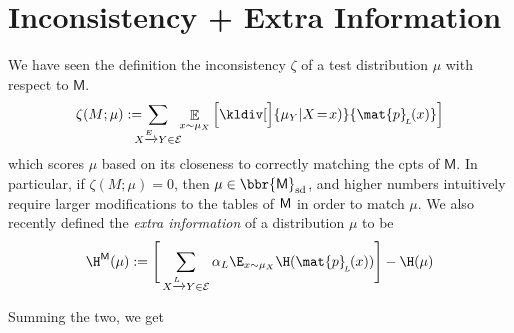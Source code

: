 \documentclass{article}
\newcommand{\bp}[1][L]{\mat{p}_{\!_#1\!}}
\newcommand{\Ed}{\mathcal E}
\newcommand{\sfM}{\mathsf M}
\newcommand\SD{_{\text{sd}}}
\begin{document}
	
	\section{Inconsistency + Extra Information}
			
		We have seen the definition the inconsistency $\zeta$ of a test distribution $\mu$ with respect to $\sfM$.
		\[
			\zeta(M ; \mu) := %
			\!\!\!\!\!\sum_{ X \xrightarrow{\!\!E} Y  \in \Ed }\!\! \mathop{\mathbb E}_{x \sim \mu_X} \left[\kldiv[\Big]{ \mu_Y | X \!=\! x) }{\bp(x) } \right]
		\] 
		which scores $\mu$ based on its closeness to correctly matching the cpts of $\sfM$. In particular, if $\zeta(M;\mu) = 0$, then $\mu \in \bbr{\sfM}\SD$, and higher numbers intuitively require larger modifications to the tables of $\sf M$ in order to match $\mu$.     
		We also recently defined the \emph{extra information} of a distribution $\mu$ to be
		\[ \H^{\sfM}(\mu) := \Bigg[\sum_{ X \xrightarrow{\!\!L} Y  \in \Ed } \alpha_L \E_{x \sim \mu_X}  \H (\bp (x)) \Bigg] - \H(\mu) \] 
		
		Summing the two, we get 
	
\end{document}
